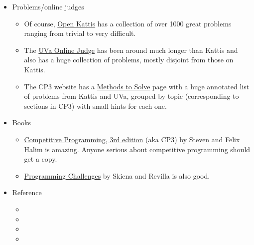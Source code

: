 \documentclass[10pt]{book}
\newif\iftodos
\newcommand{\todo}[1]{\iftodos\textcolor{red}{[TODO: #1]}\fi}
\begin{document}
\begin{itemize}
\item Problems/online judges
  \begin{itemize}
  \item Of course, \href{http://open.kattis.com}{Open Kattis} has a
    collection of over 1000 great problems ranging from trivial to
    very difficult.
  \item The \href{https://uva.onlinejudge.org/}{UVa Online Judge} has
    been around much longer than Kattis and also has a huge collection
    of problems, mostly disjoint from those on Kattis.
  \item The CP3 website has a
    \href{https://cpbook.net/methodstosolve}{Methods to Solve} page
    with a huge annotated list of problems from Kattis and UVa,
    grouped by topic (corresponding to sections in CP3) with small
    hints for each one.
  \end{itemize}
\item Books
  \begin{itemize}
  \item \href{http://cpbook.net}{Competitive Programming, 3rd edition}
    (aka CP3) by Steven and Felix Halim is amazing.  Anyone serious
    about competitive programming should get a copy.
  \item
    \href{http://acm.cs.buap.mx/downloads/Programming_Challenges.pdf}{Programming
      Challenges} by Skiena and Revilla is also good.
  \end{itemize}
\item Reference
  \begin{itemize}
  \item \todo{Geeksforgeeks}
  \item \todo{Topcoder}
  \item \todo{Codeforces}
  \item \todo{cp-algorithms.com}
  \end{itemize}
\end{itemize}
\end{document}
